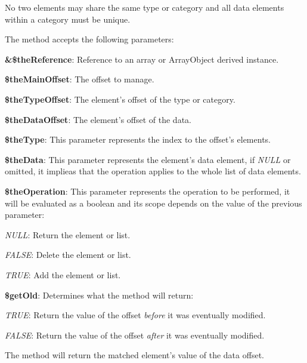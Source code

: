 No two elements may share the same type or category and all data elements within a category must be unique.

The method accepts the following parameters\-:


\begin{DoxyItemize}
\item {\bfseries \&\$the\-Reference}\-: Reference to an array or Array\-Object derived instance. 
\item {\bfseries \$the\-Main\-Offset}\-: The offset to manage. 
\item {\bfseries \$the\-Type\-Offset}\-: The element's offset of the type or category. 
\item {\bfseries \$the\-Data\-Offset}\-: The element's offset of the data. 
\item {\bfseries \$the\-Type}\-: This parameter represents the index to the offset's elements. 
\item {\bfseries \$the\-Data}\-: This parameter represents the element's data element, if {\itshape N\-U\-L\-L} or omitted, it implieas that the operation applies to the whole list of data elements. 
\item {\bfseries \$the\-Operation}\-: This parameter represents the operation to be performed, it will be evaluated as a boolean and its scope depends on the value of the previous parameter\-: 
\begin{DoxyItemize}
\item {\itshape N\-U\-L\-L}\-: Return the element or list. 
\item {\itshape F\-A\-L\-S\-E}\-: Delete the element or list. 
\item {\itshape T\-R\-U\-E}\-: Add the element or list. 
\end{DoxyItemize}
\item {\bfseries \$get\-Old}\-: Determines what the method will return\-: 
\begin{DoxyItemize}
\item {\itshape T\-R\-U\-E}\-: Return the value of the offset {\itshape before} it was eventually modified. 
\item {\itshape F\-A\-L\-S\-E}\-: Return the value of the offset {\itshape after} it was eventually modified. 
\end{DoxyItemize}
\end{DoxyItemize}

The method will return the matched element's value of the data offset.


